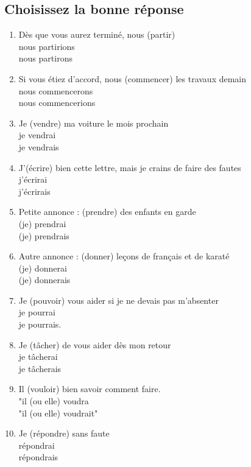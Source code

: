 \documentclass[12pt]{article}
\begin{document}
\subsection{Choisissez la bonne réponse}
\begin{enumerate}
		\item Dès que vous aurez terminé, nous (partir)\\ 
	       nous partirions \\ 
	       nous partirons 
	      \item Si vous étiez d'accord, nous (commencer) les travaux demain \\  nous commencerons \\ 
	       nous commencerions 
	      \item Je (vendre) ma voiture le mois prochain \\ 
	       je vendrai \\ 
	       je vendrais 
	      \item J'(écrire) bien cette lettre, mais je crains de faire des fautes \\  j'écrirai \\ 
	       j'écrirais 
	      \item Petite annonce : (prendre) des enfants en garde \\ 
	       (je) prendrai \\ 
	       (je) prendrais 
	      \item Autre annonce : (donner) leçons de français et de karaté \\  (je) donnerai \\  (je) donnerais 
	      \item Je (pouvoir) vous aider si je ne devais pas m'absenter \\  je pourrai \\  je pourrais.
	      \item Je (tâcher) de vous aider dès mon retour \\ 
	       je tâcherai \\  je tâcherais 
	      \item Il (vouloir) bien savoir comment faire. \\ 
	       "il (ou elle) voudra \\ 
	       "il (ou elle) voudrait" 
	      \item Je (répondre) sans faute \\ 
	       répondrai \\ 
	       répondrais
\end{enumerate}
\end{document}
